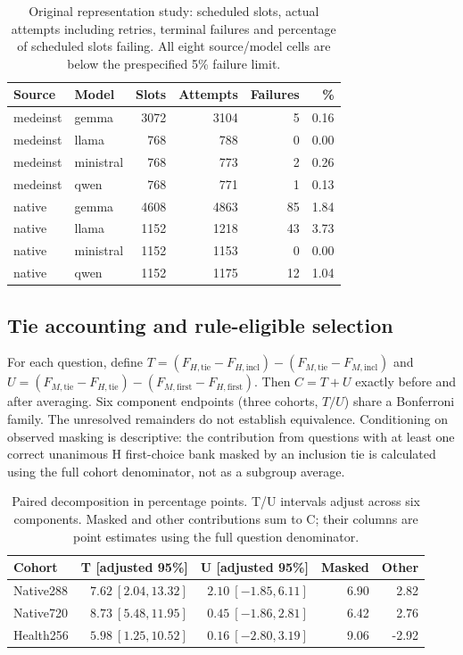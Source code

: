 \begin{table}[ht]
\centering\small
\caption{Original representation study: scheduled slots, actual attempts including retries, terminal failures and percentage of scheduled slots failing. All eight source/model cells are below the prespecified 5\% failure limit.}
\label{tab:failure_cells}
\begin{tabular}{llrrrr}
\toprule
Source & Model & Slots & Attempts & Failures & \%\\
\midrule
medeinst & gemma & 3072 & 3104 & 5 & 0.16\\
medeinst & llama & 768 & 788 & 0 & 0.00\\
medeinst & ministral & 768 & 773 & 2 & 0.26\\
medeinst & qwen & 768 & 771 & 1 & 0.13\\
native & gemma & 4608 & 4863 & 85 & 1.84\\
native & llama & 1152 & 1218 & 43 & 3.73\\
native & ministral & 1152 & 1153 & 0 & 0.00\\
native & qwen & 1152 & 1175 & 12 & 1.04\\
\bottomrule
\end{tabular}
\end{table}

\subsection{Tie accounting and rule-eligible selection}
For each question, define $T=(F_{H,\mathrm{tie}}-F_{H,\mathrm{incl}})-(F_{M,\mathrm{tie}}-F_{M,\mathrm{incl}})$ and $U=(F_{M,\mathrm{tie}}-F_{H,\mathrm{tie}})-(F_{M,\mathrm{first}}-F_{H,\mathrm{first}})$. Then $C=T+U$ exactly before and after averaging. Six component endpoints (three cohorts, $T/U$) share a Bonferroni family. The unresolved remainders do not establish equivalence. Conditioning on observed masking is descriptive: the contribution from questions with at least one correct unanimous H first-choice bank masked by an inclusion tie is calculated using the full cohort denominator, not as a subgroup average.

\begin{table}[ht]
\centering\small
\caption{Paired decomposition in percentage points. T/U intervals adjust across six components. Masked and other contributions sum to C; their columns are point estimates using the full question denominator.}
\begin{tabular}{lrrrr}
\toprule
Cohort & T [adjusted 95\%] & U [adjusted 95\%] & Masked & Other\\
\midrule
Native288 & $7.62\ [2.04,13.32]$ & $2.10\ [-1.85,6.11]$ & 6.90 & 2.82\\
Native720 & $8.73\ [5.48,11.95]$ & $0.45\ [-1.86,2.81]$ & 6.42 & 2.76\\
Health256 & $5.98\ [1.25,10.52]$ & $0.16\ [-2.80,3.19]$ & 9.06 & -2.92\\
\bottomrule
\end{tabular}
\end{table}

